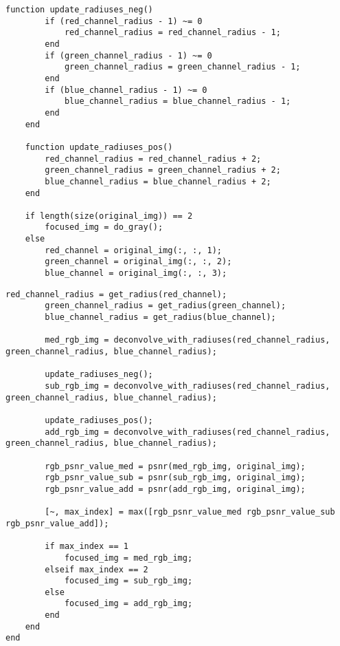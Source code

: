 \begin{appendices}
\begin{lstlisting}[caption={Функция слепой деконволюции (продолжение)}]
	function update_radiuses_neg()
		if (red_channel_radius - 1) ~= 0
			red_channel_radius = red_channel_radius - 1;
		end
		if (green_channel_radius - 1) ~= 0
			green_channel_radius = green_channel_radius - 1;
		end
		if (blue_channel_radius - 1) ~= 0
			blue_channel_radius = blue_channel_radius - 1;
		end
	end
	
	function update_radiuses_pos()
		red_channel_radius = red_channel_radius + 2;
		green_channel_radius = green_channel_radius + 2;
		blue_channel_radius = blue_channel_radius + 2;
	end
	
	if length(size(original_img)) == 2
		focused_img = do_gray();
	else
		red_channel = original_img(:, :, 1);
		green_channel = original_img(:, :, 2);
		blue_channel = original_img(:, :, 3);		
\end{lstlisting}
\clearpage
\begin{lstlisting}[caption={Функция слепой деконволюции (продолжение)}]
		red_channel_radius = get_radius(red_channel);
		green_channel_radius = get_radius(green_channel);
		blue_channel_radius = get_radius(blue_channel);
		
		med_rgb_img = deconvolve_with_radiuses(red_channel_radius, green_channel_radius, blue_channel_radius);
		
		update_radiuses_neg();
		sub_rgb_img = deconvolve_with_radiuses(red_channel_radius, green_channel_radius, blue_channel_radius);
		
		update_radiuses_pos();
		add_rgb_img = deconvolve_with_radiuses(red_channel_radius, green_channel_radius, blue_channel_radius);
		
		rgb_psnr_value_med = psnr(med_rgb_img, original_img);
		rgb_psnr_value_sub = psnr(sub_rgb_img, original_img);
		rgb_psnr_value_add = psnr(add_rgb_img, original_img);
		
		[~, max_index] = max([rgb_psnr_value_med rgb_psnr_value_sub rgb_psnr_value_add]);
		
		if max_index == 1
			focused_img = med_rgb_img;
		elseif max_index == 2
			focused_img = sub_rgb_img;
		else
			focused_img = add_rgb_img;
		end
	end
end
\end{lstlisting}

\end{appendices}